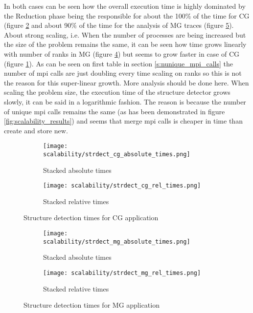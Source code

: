 In both cases can be seen how the overall execution time is highly dominated
by the Reduction phase being the responsible for about the 100\% of the time for
CG (figure \ref{fig:cg_stdrec_rel} and about 90\% of the time for the analysis
of MG traces (figure \ref{fig:mg_stdrec_rel}). 
About strong scaling, i.e. When the number of processes are being
increased but the size of the problem remains the same, it can be seen
how time grows linearly with number of ranks in MG
(figure \ref{fig:mg_strdec_abs}) but seems to grow faster in case of CG (figure
\ref{fig:cg_strdec_abs}). As can be seen on first table in section \ref{s:nunique_mpi_calls} the
number of mpi calls are just doubling every time scaling on ranks so this is not
the reason for this super-linear growth. More analysis should be done here.
When scaling the problem size, the execution time of the
structure detector grows slowly, it can be said in a logarithmic fashion. The
reason is because the number of unique mpi calls remains the same (as
has been demonstrated in figure \ref{fig:scalability_results}) and seems that
merge mpi calls is cheaper in time than create and store new.

\begin{figure}
    \centering
    \begin{subfigure}[b]{0.45\textwidth}
        \texttt{[image: scalability/strdect\_cg\_absolute\_times.png]}
        \caption{Stacked absolute times}
        \label{fig:cg_strdec_abs}
    \end{subfigure}
    \medspace
    \begin{subfigure}[b]{0.45\textwidth}
        \texttt{[image: scalability/strdect\_cg\_rel\_times.png]}
        \caption{Stacked relative times}
        \label{fig:cg_stdrec_rel}
    \end{subfigure}
    \caption{Structure detection times for CG application}
    \label{fig:scalability_results_cg}
\end{figure}

\begin{figure}
    \centering
    \begin{subfigure}[b]{0.45\textwidth}
        \texttt{[image: scalability/strdect\_mg\_absolute\_times.png]}
        \caption{Stacked absolute times}
        \label{fig:mg_strdec_abs}
    \end{subfigure}
    \medspace
    \begin{subfigure}[b]{0.45\textwidth}
        \texttt{[image: scalability/strdect\_mg\_rel\_times.png]}
        \caption{Stacked relative times}
        \label{fig:mg_stdrec_rel}
    \end{subfigure}
    \caption{Structure detection times for MG application}
    \label{fig:scalability_results_mg}
\end{figure}
